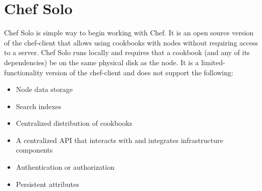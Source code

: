 \chapter{Chef Solo}

Chef Solo is simple way to begin working with Chef. It is an open source version of the chef-client that allows using cookbooks with nodes without requiring access to a server. Chef Solo runs locally and requires that a cookbook (and any of its dependencies) be on the same physical disk as the node. It is a limited-functionality version of the chef-client and does not support the following:

\begin{itemize}
  \item Node data storage
  \item Search indexes
  \item Centralized distribution of cookbooks
  \item A centralized API that interacts with and integrates infrastructure components
  \item Authentication or authorization
  \item Persistent attributes
\end{itemize}

